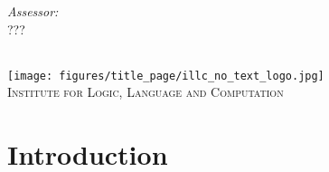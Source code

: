 \documentclass{report}
\newcommand{\red}[1]{{\color{red}{#1}}}
\begin{document}
{\begin{titlepage}
\begin{minipage}[t]{0.4\textwidth}
\begin{flushright} \large

\emph{Assessor:} \\

???


\end{flushright}

\end{minipage}\\[2cm]









\texttt{[image: figures/title\_page/illc\_no\_text\_logo.jpg]}\\ %

\textsc{\large Institute for Logic, Language and Computation}\\[1.0cm] %

 




\vfill %



\end{titlepage}
\clearpage
\restoregeometry
}


\doublespacing
\tableofcontents

% 

\newpage
\chapter{Introduction}

\end{document}
